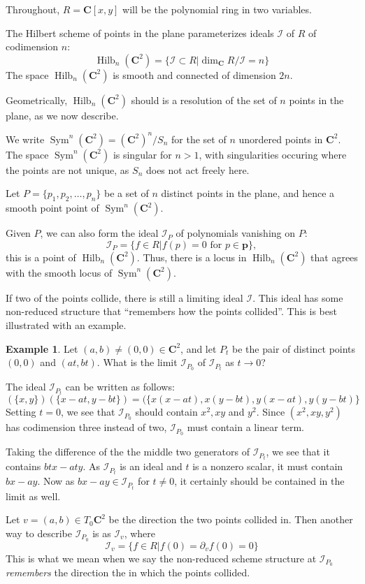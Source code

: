 \documentclass{amsart}[12pt]
\theoremstyle{definition}
\newtheorem{example}[dummy]{Example}
\newcommand{\C}{\mathbf{C}}
\newcommand{\II}{\mathcal{I}}
\DeclareMathOperator{\Hilb}{Hilb}
\DeclareMathOperator{\Sym}{Sym}
\begin{document}
Throughout, $R=\C[x,y]$ will be the polynomial ring in two variables.  

The Hilbert scheme of points in the plane parameterizes ideals $\II$ of $R$ of codimension $n$:
$$\Hilb_n(\C^2)=\{\II\subset R | \dim_\C R/\II=n\}$$
The space $\Hilb_n(\C^2)$ is smooth and connected of dimension $2n$.

Geometrically, $\Hilb_n(\C^2)$ should is a resolution of the set of $n$ points in the plane, as we now describe.

 We write $\Sym^n(\C^2)=(\C^2)^n/S_n$ for the set of $n$ unordered points in $\C^2$.  The space $\Sym^n(\C^2)$ is singular for $n>1$, with singularities occuring where the points are not unique, as $S_n$ does not act freely here.  

Let $P=\{p_1,p_2,\dots, p_n\}$ be a set of $n$ distinct points in the plane, and hence a smooth point point of $\Sym^n(\C^2)$.  

Given $P$, we can also form the ideal $\II_P$ of polynomials vanishing on $P$:
 $$\II_{P}=\{f\in R| f(p)=0 \text{ for }p\in \mathbf{p}\},$$  
this is a point of $\Hilb_n(\C^2)$.  Thus, there is a locus in $\Hilb_n(\C^2)$ that agrees with the smooth locus of $\Sym^n(\C^2)$. 

 If two of the points collide, there is still a limiting ideal $\II$.  This ideal has some non-reduced structure that ``remembers how the points collided''.  This is best illustrated with an example.


\begin{example} \label{ex:twopoints}
Let $(a,b)\neq (0,0)\in\C^2$, and let $P_t$ be the pair of distinct points $(0,0)$ and $(at,bt)$.  What is the limit $\II_{P_0}$ of $\II_{P_t}$ as $t\to 0$?

The ideal $\II_{P_t}$ can be written as follows: 
$$(\{x,y\})(\{x-at,y-bt\})=(\{x(x-at),x(y-bt), y(x-at), y(y-bt)\}$$
Setting $t=0$, we see that $\II_{P_0}$ should contain $x^2, xy$ and $y^2$.  Since $(x^2,xy,y^2)$ has codimension three instead of two, $\II_{P_0}$ must contain a linear term.

Taking the difference of the the middle two generators of $\II_{P_t}$, we see that it contains $btx-aty$. As $\II_{P_t}$ is an ideal and $t$ is a nonzero scalar, it must contain $bx-ay$.  Now as $bx-ay\in \II_{P_t}$ for $t\neq 0$, it certainly should be contained in the limit as well.  

Let $v=(a,b)\in T_0\C^2$ be the direction the two points collided in.  Then another way to describe $\II_{P_0}$ is as $\II_v$, where
$$\II_{v}=\{f\in R| f(0)=\partial_vf(0)=0\}$$
This is what we mean when we say the non-reduced scheme structure at $\II_{P_0}$ \emph{remembers} the direction the in which the points collided. 
\end{example}
\end{document}
